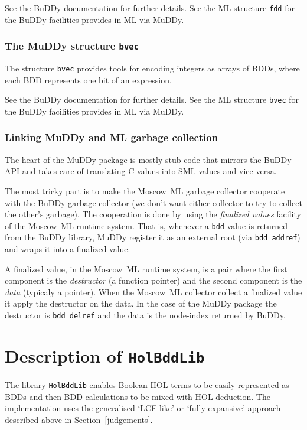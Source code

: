 \documentclass[12pt]{article}
\renewcommand{\t}[1]{\mbox{\tt #1}}
\newcommand\HOL{HOL\xspace}
\newcommand{\mosml}{Moscow~ML\xspace}
\newcommand{\Buddy}{BuDDy\xspace}
\newcommand{\Muddy}{MuDDy\xspace}
\begin{document}
See the \Buddy{} documentation \cite{BuDDy} for further details. See the ML structure \t{fdd}
for the \Buddy{} facilities provides in ML via \Muddy.

\section{The \Muddy{} structure \t{bvec}}\label{bvec}

The structure \t{bvec} provides tools for encoding integers as arrays
of BDDs, where each BDD represents one bit of an expression.

See the \Buddy{} documentation \cite{BuDDy} for further details. See the ML structure \t{bvec}
for the \Buddy{} facilities provides in ML via \Muddy{}.

\section{Linking \Muddy{} and ML garbage collection}
\label{sec:technical-details}

The heart of the \Muddy package is mostly stub code that mirrors the
\Buddy API and takes care of translating C values into SML values and
vice versa.

The most tricky part is to make the \mosml garbage collector cooperate
with the \Buddy garbage collector (we don't want either collector to
try to collect the other's garbage).  The cooperation is done by using
the \emph{finalized values} facility of the \mosml runtime system.
That is, whenever a \texttt{bdd} value is returned from the \Buddy
library, \Muddy register it as an external root (via
\verb+bdd_addref+) and wraps it into a finalized value.  

A finalized value, in the \mosml runtime system, is a pair where the
first component is the \emph{destructor} (a function pointer) and the
second component is the \emph{data} (typicaly a pointer).  When the
\mosml collector collect a finalized value it apply the destructor on
the data.  In the case of the \Muddy package the destructor is
\verb+bdd_delref+ and the data is the node-index returned by \Buddy.

\newpage

\part{Description of \t{HolBddLib}}\label{HolBddLib}

The library \t{HolBddLib} enables Boolean \HOL{} terms to be easily
represented as BDDs and then BDD calculations to be mixed with \HOL{} deduction.
The implementation uses the generalised `LCF-like' or `fully expansive'  approach
described above in Section~\ref{judgements}.
\end{document}
